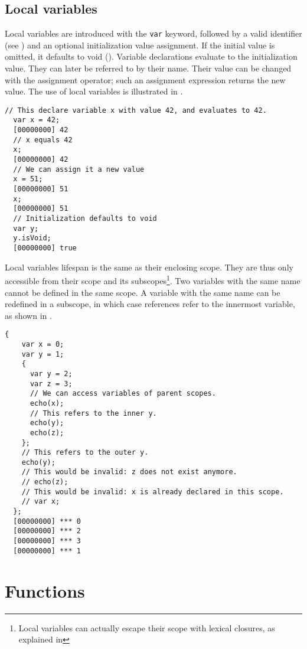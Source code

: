 \documentclass[openright,twoside,12pt]{report}
\begin{document}
\subsection{Local variables}

Local variables are introduced with the \lstinline|var| keyword,
followed by a valid identifier (see ) and an optional
initialization value assignment. If the initial value is omitted, it
defaults to void (). Variable declarations evaluate to
the initialization value. They can later be referred to by their
name. Their value can be changed with the assignment operator; such an
assignment expression returns the new value. The use of local
variables is illustrated in .

\begin{lstlisting}[caption=Using local variables,
  label=lst:local-variables,float=\floatpos]
  // This declare variable x with value 42, and evaluates to 42.
  var x = 42;
  [00000000] 42
  // x equals 42
  x;
  [00000000] 42
  // We can assign it a new value
  x = 51;
  [00000000] 51
  x;
  [00000000] 51
  // Initialization defaults to void
  var y;
  y.isVoid;
  [00000000] true
\end{lstlisting}

Local variables lifespan is the same as their enclosing scope. They
are thus only accessible from their scope and its
subscopes\footnote{Local variables can actually escape their scope
  with lexical closures, as explained in }. Two
variables with the same name cannot be defined in the same scope. A
variable with the same name can be redefined in a subscope, in which
case references refer to the innermost variable, as shown in
.

\begin{lstlisting}[caption=Local variables scoping,
  label=lst:local-variables-scoping,float=\floatpos]
  {
    var x = 0;
    var y = 1;
    {
      var y = 2;
      var z = 3;
      // We can access variables of parent scopes.
      echo(x);
      // This refers to the inner y.
      echo(y);
      echo(z);
    };
    // This refers to the outer y.
    echo(y);
    // This would be invalid: z does not exist anymore.
    // echo(z);
    // This would be invalid: x is already declared in this scope.
    // var x;
  };
  [00000000] *** 0
  [00000000] *** 2
  [00000000] *** 3
  [00000000] *** 1
\end{lstlisting}

\FloatBarrier
\section{Functions}
\end{document}
